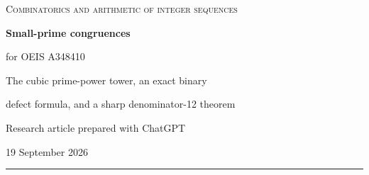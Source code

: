 \documentclass[11pt,a4paper]{article}
\numberwithin{equation}{section}
\theoremstyle{definition}
\theoremstyle{remark}
\newcommand{\eps}{\varepsilon}
\newcommand{\A}{A_{\alpha,\beta}}
\begin{document}
\begin{titlepage}
\thispagestyle{empty}
\vspace*{11mm}
{\color{accent}\large\scshape Combinatorics and arithmetic of integer sequences\par}
\vspace{10mm}
{\color{ink}\LARGE\bfseries Small-prime congruences\par
for OEIS A348410\par}
\vspace{6mm}
{\Large The cubic prime-power tower, an exact binary\par
defect formula, and a sharp denominator-12 theorem\par}
\vspace{10mm}
{\large Research article prepared with ChatGPT\par}
{19 September 2026\par}
\vspace{9mm}
\hrule
\vspace{5mm}
\begin{abstract}
Let $a(n)=[x^n]((1-x)(1-x^2))^{-n}$, the basket sequence OEIS A348410,
and more generally
$\A(n)=[x^n](1-x)^{-\alpha n}(1+x)^{-\beta n}$ for arbitrary integer
parameters. An OEIS comment of Peter Bala conjectures the cubic congruence
$a(mp^r)\equiv a(mp^{r-1})\pmod{p^{3r}}$ for primes $p\ge5$.

We prove two theorems. First, for every odd prime $p$ and every $N$
divisible by $p$, the difference $\A(N)-\A(N/p)$ is divisible by
$p^{3v_p(N)-\eps_p}$, where $\eps_3=1$ and $\eps_p=0$ for $p\ge5$; no
coprimality restriction on the multiplier is needed. This contains Bala's
assertion. A prior public proof candidate for the same odd-prime statement
was located during the source audit and is credited below; no priority is
claimed for it. Second, at the prime left untreated in that source we prove
an explicit first binary defect congruence modulo $2^{3r-2}$, which gives a
sharp universal modulus $2^{3r-3}$, improved to $2^{3r-2}$ when $\alpha\beta$
is even.


\end{abstract}
\end{titlepage}
\end{document}
